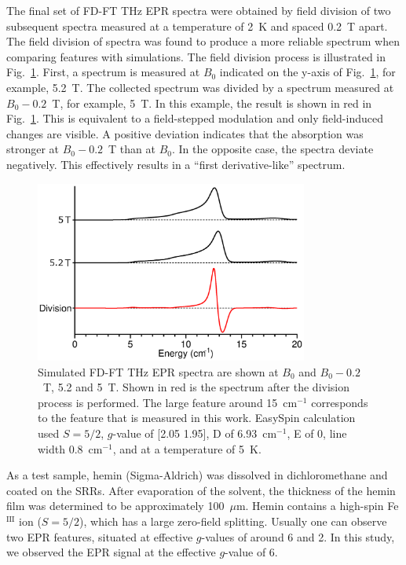 The final set of FD-FT THz EPR spectra were obtained by field division of two subsequent spectra measured at a temperature of 2~K and spaced 0.2~T apart. The field division of spectra was found to produce a more reliable spectrum when comparing features with simulations. \cite{Schnegg09,Nehrkorn13,NEHRKORN201710} The field division process is illustrated in Fig.~\ref{ch4-fig:FDS}. First, a spectrum is measured at $B_0$ indicated on the y-axis of Fig.~\ref{ch4-fig:FDS}, for example, 5.2~T. The collected spectrum was divided by a spectrum measured at $B_0 - 0.2$~T, for example, 5~T. In this example, the result is shown in red in Fig.~\ref{ch4-fig:FDS}. This is equivalent to a field-stepped modulation and only field-induced changes are visible. A positive deviation indicates that the absorption was stronger at $B_0 - 0.2$~T than at $B_0$. In the opposite case, the spectra deviate negatively. This effectively results in a ``first derivative-like'' spectrum.

\begin{figure}[htp]
\centering
  \includegraphics[width=0.8\textwidth]{Kapitel/Ch4-Images/Ch4-ExperimentExplain.eps}
  \caption[FD-FT THz EPR field division of spectra]{Simulated FD-FT THz EPR spectra are shown at $B_0$ and $B_0 - 0.2$~T, 5.2 and 5~T. Shown in red is the spectrum after the division process is performed. The large feature around 15~cm$^{-1}$ corresponds to the feature that is measured in this work. EasySpin calculation used $S=5/2$, $g$-value of [2.05 1.95], D of 6.93~cm$^{-1}$, E of 0, line width 0.8~cm$^{-1}$, and at a temperature of 5~K.}
  \label{ch4-fig:FDS}
\end{figure}

As a test sample, hemin (Sigma-Aldrich) was dissolved in dichloromethane and coated on the SRRs. After evaporation of the solvent, the thickness of the hemin film was determined to be approximately 100~$\mu$m. Hemin contains a high-spin Fe$^\text{III}$ ion ($S = 5/2$), which has a large zero-field splitting. \cite{Nehrkorn15,Johnson66,Marathe73,Lang66} Usually one can observe two EPR features, situated at effective $g$-values of around 6 and 2. \cite{Pilbrow90} In this study, we observed the EPR signal at the effective $g$-value of 6. 

